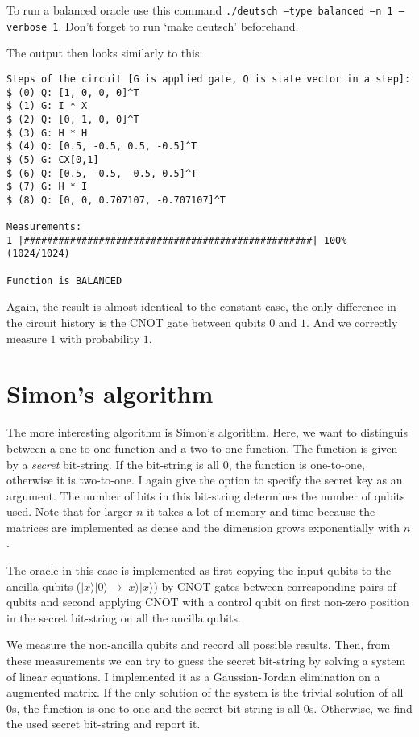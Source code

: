 \documentclass[a4paper,11pt]{article}
\begin{document}
To run a balanced oracle use this command \texttt{./deutsch --type balanced --n 1 --verbose 1}.
Don't forget to run `make deutsch' beforehand.

The output then looks similarly to this:
\begin{verbatim}
Steps of the circuit [G is applied gate, Q is state vector in a step]:
$ (0) Q: [1, 0, 0, 0]^T
$ (1) G: I * X
$ (2) Q: [0, 1, 0, 0]^T
$ (3) G: H * H
$ (4) Q: [0.5, -0.5, 0.5, -0.5]^T
$ (5) G: CX[0,1]
$ (6) Q: [0.5, -0.5, -0.5, 0.5]^T
$ (7) G: H * I
$ (8) Q: [0, 0, 0.707107, -0.707107]^T

Measurements: 
1 |##################################################| 100% (1024/1024)

Function is BALANCED
\end{verbatim}

Again, the result is almost identical to the constant case, the only difference in the circuit history is the CNOT gate between qubits $0$ and $1$.
And we correctly measure $1$ with probability $1$.

\section{Simon's algorithm}
The more interesting algorithm is Simon's algorithm.
Here, we want to distinguis between a one-to-one function and a two-to-one function.
The function is given by a \textit{secret} bit-string. If the bit-string is all $0$, the function is one-to-one, otherwise it is two-to-one.
I again give the option to specify the secret key as an argument.
The number of bits in this bit-string determines the number of qubits used.
Note that for larger $n$ it takes a lot of memory and time because the matrices are implemented as dense and the dimension grows exponentially with $n$.

The oracle in this case is implemented as first copying the input qubits to the ancilla qubits ($|x\rangle|0\rangle \rightarrow |x\rangle |x\rangle$) by CNOT gates between corresponding pairs of qubits and second applying CNOT with a control qubit on first non-zero position in the secret bit-string on all the ancilla qubits.

We measure the non-ancilla qubits and record all possible results.
Then, from these measurements we can try to guess the secret bit-string by solving a system of linear equations.
I implemented it as a Gaussian-Jordan elimination on a augmented matrix.
If the only solution of the system is the trivial solution of all $0$s, the function is one-to-one and the secret bit-string is all $0$s.
Otherwise, we find the used secret bit-string and report it.
\end{document}
